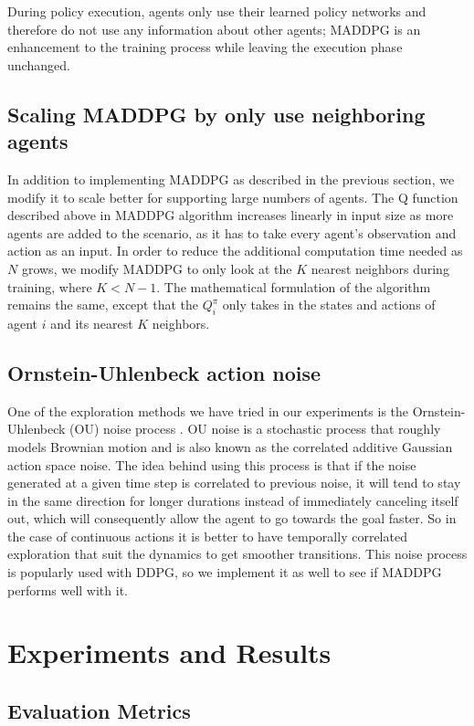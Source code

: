 \documentclass{article}
\begin{document}
During policy execution, agents only use their learned policy networks and therefore do not use any information about other agents; MADDPG is an enhancement to the training process while leaving the execution phase unchanged.

\subsection{Scaling MADDPG by only use neighboring agents}
In addition to implementing MADDPG as described in the previous section, we modify it to scale better for supporting large numbers of agents. The Q function described above in MADDPG algorithm increases linearly in input size as more agents are added to the scenario, as it has to take every agent's observation and action as an input. In order to reduce the additional computation time needed as $N$ grows, we modify MADDPG to only look at the $K$ nearest neighbors during training, where $K < N-1$. The mathematical formulation of the algorithm remains the same, except that the $Q^\pi_i$ only takes in the states and actions of agent $i$ and its nearest $K$ neighbors.

\subsection{Ornstein-Uhlenbeck action noise}
One of the exploration methods we have tried in our experiments is the Ornstein-Uhlenbeck (OU) noise process \cite{ou}. OU noise is a stochastic process that roughly models Brownian motion and is also known as the correlated additive Gaussian action space noise. The idea behind using this process is that if the noise generated at a given time step is correlated to previous noise, it will tend to stay in the same direction for longer durations instead of immediately canceling itself out, which will consequently allow the agent to go towards the goal faster. So in the case of continuous actions it is better to have temporally correlated exploration that suit the dynamics to get smoother transitions. This noise process is popularly used with DDPG, so we implement it as well to see if MADDPG performs well with it.

\section{Experiments and Results}
\subsection{Evaluation Metrics}
\end{document}
